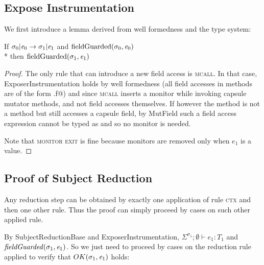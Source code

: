 \subsection{Expose Instrumentation}
We first introduce a lemma derived from well formedness and the type system:
\begin{Lemma}[ExposerInstrumentation]
If $\sigma_0 | \e_0\rightarrow \sigma_1 |\e_1$ and
$\text{fieldGuarded}(\sigma_0,\e_0)$
\\*
then $\text{fieldGuarded}(\sigma_1,\e_1)$
\end{Lemma}
\begin{proof}
The only rule that can 
introduce a new field access is \textsc{mcall}.
In that case, ExposerInstrumentation holds
by well formedness (all field accesses in methods are of the form \Q@this.f@) 
and since \textsc{mcall} inserts a monitor while invoking capsule mutator methods, and not field accesses themselves. If however the method is not a \Q@mut@ method but still accesses a capsule field, by MutField such a field access expression cannot be typed as \Q@mut@ and so no monitor is needed.

Note that \textsc{monitor exit} is fine because monitors are removed only when
 $e_1$ is a value.
\end{proof}

\subsection{Proof of Subject Reduction}
Any reduction step can be obtained
by exactly one application of rule \textsc{ctx} and then one other rule. Thus the proof can simply proceed by cases on such other applied rule.

By SubjectReductionBase and ExposerInstrumentation, 
$\Sigma^{\sigma_1};\emptyset\vdash e_1: T_1$ and  $\mathit{fieldGuarded}(\sigma_1,\e_1)$. So we just need to proceed by cases on the reduction rule applied to verify that $OK(\sigma_1,\e_1)$ holds:


